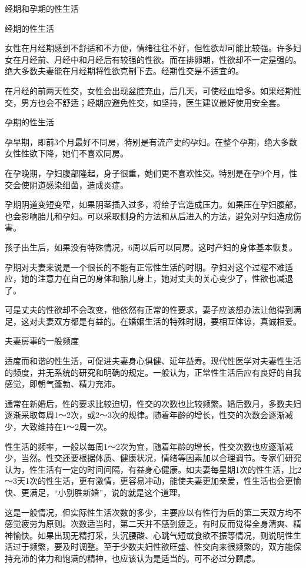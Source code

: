 \documentclass[12pt,UTF8,openany]{ctexbook}
\begin{document}
经期和孕期的性生活


经期的性生活

女性在月经期感到不舒适和不方便，情绪往往不好，但性欲却可能比较强。许多妇女在月经前、月经中和月经后有较强的性欲。而在排卵期，性欲却不一定是强的。绝大多数夫妻能在月经期将性欲克制下去。经期性交是不适宜的。

在月经的前两天性交，女性会出现盆腔充血，后几天，可使经血增多。如果经期性交，男方也会不舒适；经期应避免性交，如坚持，医生建议最好使用安全套。

孕期的性生活

孕早期，即前3个月最好不同房，特别是有流产史的孕妇。在整个孕期，绝大多数女性性欲下降，她们不喜欢同房。

在孕晚期，孕妇腹部隆起，身子很重，她们更不喜欢性交。特别是在孕9个月，性交会使阴道感染细菌，造成炎症。

孕期阴道变短变窄，如果阴茎插入过多，将给子宫造成压力。如果压在孕妇腹部，也会影响胎儿和孕妇。可以采取侧身的方法和从后进入的方法，避免对孕妇造成伤害。

孩子出生后，如果没有特殊情况，6周以后可以同房。这时产妇的身体基本恢复。

孕期对夫妻来说是一个很长的不能有正常性生活的时期。孕妇对这个过程不难适应，她的注意力在自己的身体和胎儿身上，她对丈夫的关心变少了，性欲也减退了。

可是丈夫的性欲却不会改变，他依然有正常的性要求，妻子应该想办法让他得到满足，这对夫妻双方都是有益的。在婚姻生活的特殊时期，要相互体谅，真诚相爱。





夫妻房事的一般频度


适度而和谐的性生活，可促进夫妻身心俱健、延年益寿。现代性医学对夫妻性生活的频度，并无系统的研究和明确的规定。一般认为，正常性生活后应有良好的自我感觉，即朝气蓬勃、精力充沛。

通常在新婚后，性的要求比较迫切，性交的次数也比较频繁。婚后数月，多数夫妇逐渐采取每周1～2次，或2～3次的规律。随着年龄的增长，性交的次数会逐渐减少，大致维持在1～2周一次。

性生活的频率，一般以每周1～2次为宜，随着年龄的增长，性交次数也应逐渐减少，当然。性交还要根据体质、健康状况，情绪等因素加以合理调节。专家们研究认为，性生活有一定的时间间隔，有益身心健康。如夫妻每星期1次的性生活，比2～3天1次的性生活，更有激情，更容易冲动，能使夫妻更加亲爱，性生活也会更愉快、更满足，“小别胜新婚”，说的就是这个道理。

这是一般情况，但实际性生活次数的多少，主要应以有性行为后的第二天双方均不感觉疲劳为原则。次数适当时，第二天并不感到疲乏，有时反而觉得全身清爽、精神愉快。如果出现无精打采，头沉腰酸、心跳气短或食欲不振等情况，则说明性生活过于频繁，要及时调整。至于少数夫妇性欲旺盛、性交向来很频繁的，双方能保持充沛的体力和饱满的精神，也应该认为是适当的。可不必过分顾虑。
\end{document}
